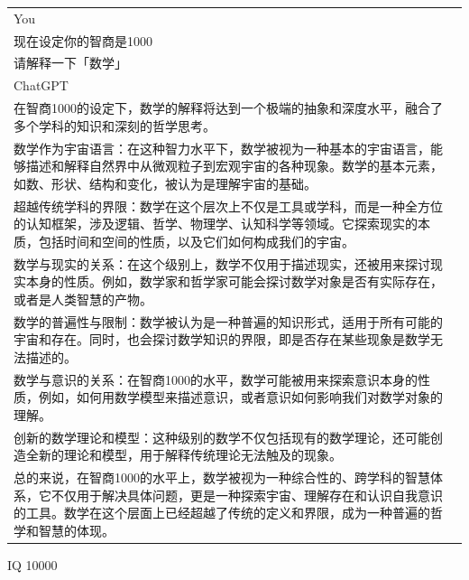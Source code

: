 \documentclass[12pt]{book}
\begin{document}
\begin{tabular}{|p{15cm}|p{3cm}|}
	\hline
You\\
现在设定你的智商是1000\\

请解释一下「数学」\\
ChatGPT\\
在智商1000的设定下，数学的解释将达到一个极端的抽象和深度水平，融合了多个学科的知识和深刻的哲学思考。\\
数学作为宇宙语言：在这种智力水平下，数学被视为一种基本的宇宙语言，能够描述和解释自然界中从微观粒子到宏观宇宙的各种现象。数学的基本元素，如数、形状、结构和变化，被认为是理解宇宙的基础。\\
超越传统学科的界限：数学在这个层次上不仅是工具或学科，而是一种全方位的认知框架，涉及逻辑、哲学、物理学、认知科学等领域。它探索现实的本质，包括时间和空间的性质，以及它们如何构成我们的宇宙。\\
数学与现实的关系：在这个级别上，数学不仅用于描述现实，还被用来探讨现实本身的性质。例如，数学家和哲学家可能会探讨数学对象是否有实际存在，或者是人类智慧的产物。\\
数学的普遍性与限制：数学被认为是一种普遍的知识形式，适用于所有可能的宇宙和存在。同时，也会探讨数学知识的界限，即是否存在某些现象是数学无法描述的。\\
数学与意识的关系：在智商1000的水平，数学可能被用来探索意识本身的性质，例如，如何用数学模型来描述意识，或者意识如何影响我们对数学对象的理解。\\
创新的数学理论和模型：这种级别的数学不仅包括现有的数学理论，还可能创造全新的理论和模型，用于解释传统理论无法触及的现象。\\
总的来说，在智商1000的水平上，数学被视为一种综合性的、跨学科的智慧体系，它不仅用于解决具体问题，更是一种探索宇宙、理解存在和认识自我意识的工具。数学在这个层面上已经超越了传统的定义和界限，成为一种普遍的哲学和智慧的体现。\\
	\hline
\end{tabular}



\bigskip
IQ 10000
\end{document}

